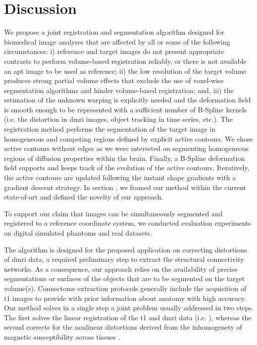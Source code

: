 \section*{Discussion}
\label{sec:discussion}
We propose a joint registration and segmentation algorithm designed for biomedical
  image analyses that are affected by all or some of the following circumstances:
  i) reference and target images do not present appropriate contrasts to
  	perform volume-based registration reliably, or there is not available an apt image
 		to be used as reference;
  ii) the low resolution of the target volume produces strong partial volume effects
  	that exclude the use of voxel-wise segmentation algorithms and hinder volume-based
  	registration; and,
  iii) the estimation of the unknown warping is explicitly needed and the
    deformation field is smooth enough to be represented with a sufficient number
  	of B-Spline kernels (i.e. the distortion in \gls*{dmri} images,
  	object tracking in time series, etc.).
The registration method performs the segmentation of the target image in homogeneous
  and competing regions defined by explicit active contours.
We chose active contours without edges as we were interested on segmenting homogeneous
  regions of diffusion properties within the brain.
Finally, a B-Spline deformation field supports and keeps track of the evolution of the
  active contours.
Iteratively, the active contours are updated following the instant shape gradients
  \citep{herbulot_segmentation_2006} with a gradient descent strategy.
In section , we framed our method within the current
  state-of-art and defined the novelty of our approach.

To support our claim that images can be simultaneously segmented and registered to a
  reference coordinate system, we conducted evaluation experiments on digital
  simulated phantoms and real datasets.

The algorithm is designed for the proposed application on correcting distortions of
  \gls*{dmri} data, a required preliminary step to extract the structural connectivity
  networks.
As a consequence, our approach relies on the availability of precise segmentations or
  surfaces of the objects that are to be segmented on the target volume(s).
Connectome extraction protocols generally include the acquisition of \gls*{t1} images
  to provide with prior information about anatomy with high accuracy.
Our method solves in a single step a joint problem usually addressed in two steps.
The first solves the linear registration of the \gls*{t1} and \gls*{dmri} data (i.e.
  \cite{greve_accurate_2009}), whereas the second corrects for the nonlinear distortions
  derived from the inhomogenety of magnetic susceptibility across tissues
  \citep{jezzard_correction_1995}.


